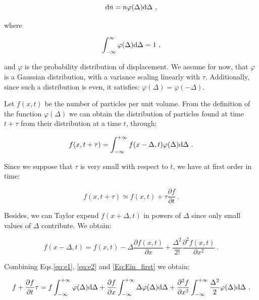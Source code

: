 \begin{equation}
	\textnormal{d}n = n\varphi(\Delta)\textnormal{d}\Delta ~,
\end{equation}

where

\begin{equation}
	\int_{-\infty} ^{\infty} \varphi (\Delta)\textnormal{d} \Delta = 1 ~,
	\label{Eq:ein_def_phi}
\end{equation}

and $\varphi$ is the probability distribution of displacement. We assume for now, that  $\varphi$ is a Gaussian distribution, with a variance scaling linearly with $\tau$. Additionally, since such a distribution is even, it satisfies: $\varphi (\Delta) = \varphi (-\Delta)$.

Let $f(x,t)$ be the number of particles per unit volume. From the definition of the function $\varphi(\Delta)$ we can obtain the distribution of particles found at time $ t + \tau$ from their distribution at a time $t$, through:

\begin{equation}
	f(x, t+\tau) = \int_{-\infty} ^{ +\infty} f(x-\Delta, t) \varphi (\Delta) \textnormal{d}\Delta ~.
	\label{Eq:Ein_first}
\end{equation}

Since we suppose that $\tau$ is very small with respect to  $t$, we have at first order in time:

\begin{equation}
	f(x, t+\tau) \simeq f(x,t) + \tau \frac{\partial f}{\partial t} ~.
	\label{eq:e1}
\end{equation}

Besides, we can Taylor expend $f(x+\Delta, t)$ in powers of $\Delta$ since only small values of $\Delta$ contribute. We obtain:

\begin{equation}
	f(x - \Delta, t) = f(x,t) - \Delta \frac{\partial f(x,t)}{\partial x} + \frac{\Delta ^2}{2!} \frac{\partial ^2 f(x,t)}{\partial x^2} ~.
	\label{eq:e2}
\end{equation}

Combining Eqs.\ref{eq:e1}, \ref{eq:e2} and \ref{Eq:Ein_first} we obtain:

\begin{equation}
	f + \frac{\partial f}{\partial t} \tau = f \int_{-\infty}^{+\infty} \varphi(\Delta)\textnormal{d} \Delta + \frac{\partial f}{\partial x} \int_{-\infty}^{+\infty} \Delta \varphi (\Delta)\textnormal{d} \Delta + \frac{\partial ^2 f}{\partial x^2} \int_{-\infty}^{+\infty} \frac{\Delta ^2}{2} \varphi(\Delta)\textnormal{d}\Delta ~.
	\label{Eq:ein_expended}
\end{equation}


